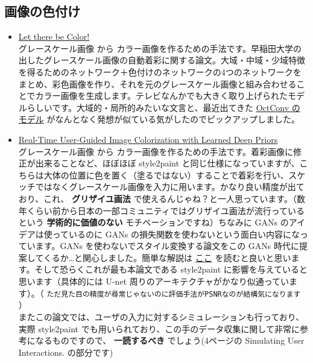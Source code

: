 \documentclass[a4paper, dvipdfmx, 10pt]{article}
\begin{document}
\subsection{画像の色付け}
\label{sec:org6163ef7}
\begin{itemize}
\item \href{http://iizuka.cs.tsukuba.ac.jp/projects/colorization/ja/}{Let there be Color!}\\

グレースケール画像 から カラー画像を作るための手法です。早稲田大学の出したグレースケール画像の自動着彩に関する論文。大域・中域・少域特徴を得るためのネットワーク＋色付けのネットワークの4つのネットワークをまとめ、彩色画像を作り、それを元のグレースケール画像と組み合わせることでカラー画像を生成します。テレビなんかでも大きく取り上げられたモデルらしいです。大域的・局所的みたいな文言と、最近出てきた \href{https://qiita.com/koshian2/items/0e40a5930f1aa63a66b9}{OctConv のモデル} がなんとなく発想が似ている気がしたのでピックアップしました。\\

\item \href{https://richzhang.github.io/ideepcolor/}{Real-Time User-Guided Image Colorization with Learned Deep Priors}\\

グレースケール画像 から カラー画像を作るための手法です。着彩画像に修正が出来ることなど、ほぼほぼ style2paint と同じ仕様になっていますが、こちらは大体の位置に色を置く（塗るではない）することで着彩を行い、スケッチではなくグレースケール画像を入力に用います。かなり良い精度が出ており、これ、 \textbf{グリザイユ画法} で使えるんじゃね？と一人思っています。（数年くらい前から日本の一部コミュニティではグリザイユ画法が流行っているという \textbf{学術的に価値のない} モチベーションですね）ちなみに GANs のアイデアは使っているのに GANs の損失関数を使わないという面白い内容になっています。GANs を使わないでスタイル変換する論文をこの GANs 時代に提案してくるか…と関心しました。簡単な解説は \href{https://github.com/DwangoMediaVillage/paper\_readings/issues/8}{ここ} を読むと良いと思います。そして恐らくこれが最も本論文である style2paint に影響を与えていると思います（具体的には U-net 周りのアーキテクチャがかなり似通っています）。（ \texttt{ただ見た目の精度が尋常じゃないのに評価手法がPSNRなのが結構気になります} ）\\

またこの論文では、ユーザの入力に対するシミュレーションも行っており、実際 style2paint でも用いられており、この手のデータ収集に関して非常に参考になるものですので、 \textbf{一読するべき} でしょう(4ページの Simulating User Interactions. の部分です)\\


\end{itemize}
\end{document}
